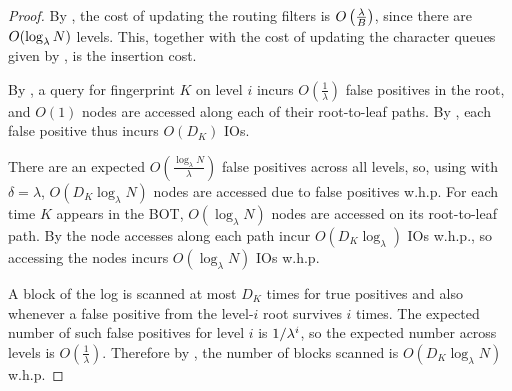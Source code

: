 \begin{proof}
	By , the cost of updating the routing
	filters is $O\left(\frac{\lambda}{B}\right)$, since there are $O(\log_\lambda
	N)$ levels. This, together with the cost of updating the character queues
	given by , is the insertion cost.

	By , a query for fingerprint $K$ on level
	$i$ incurs $O\left(\frac{1}{\lambda}\right)$ false positives in the root,
	and $O(1)$ nodes are accessed along each of their root-to-leaf paths. By
	, each false positive thus incurs $O(D_K)$
	IOs.

	There are an expected $O\left(\frac{\log_\lambda N}{\lambda}\right)$ false
	positives across all levels, so, using  with
	$\delta=\lambda$, $O(D_K\log_\lambda N)$ nodes are accessed due to false
	positives w.h.p. For each time $K$ appears in the BOT, $O(\log_\lambda N)$
	nodes are accessed on its root-to-leaf path. By
	 the node accesses along each path incur
	$O(D_K\log_\lambda)$ IOs w.h.p., so accessing the nodes incurs
	$O(\log_\lambda N)$ IOs w.h.p.

	A block of the log is scanned at most $D_K$ times for true positives and
	also whenever a false positive from the level-$i$ root survives $i$ times.
	The expected number of such false positives for level $i$ is $1/\lambda^i$,
	so the expected number across levels is $O\left(\frac{1}{\lambda}\right)$.
	Therefore by , the number of blocks scanned is
	$O(D_K\log_\lambda N)$ w.h.p.
\end{proof}

